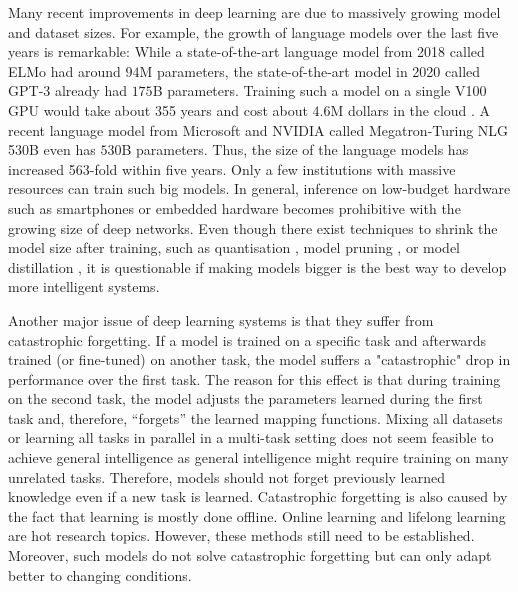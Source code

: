 Many recent improvements in deep learning are due to massively growing model and dataset sizes.
For example, the growth of language models over the last five years is remarkable:
While a state-of-the-art language model from 2018 called ELMo  had around \(94\)M parameters, the state-of-the-art model in 2020 called GPT-3  already had \(175\)B parameters. Training such a model on a single V100 GPU would take about 355 years and cost about \(4.6\)M dollars in the cloud .
A recent language model from Microsoft and NVIDIA called Megatron-Turing NLG 530B  even has \(530\)B parameters.
Thus, the size of the language models has increased 563-fold within five years.
Only a few institutions with massive resources can train such big models.
In general, inference on low-budget hardware such as smartphones or embedded hardware becomes prohibitive with the growing size of deep networks.
Even though there exist techniques to shrink the model size after training, such as quantisation , model pruning , or model distillation , it is questionable if making models bigger is the best way to develop more intelligent systems.

Another major issue of deep learning systems is that they suffer from catastrophic forgetting.
If a model is trained on a specific task and afterwards trained (or fine-tuned) on another task, the model suffers a "catastrophic" drop in performance over the first task.
The reason for this effect is that during training on the second task, the model adjusts the parameters learned during the first task and, therefore, ``forgets'' the learned mapping functions.
Mixing all datasets or learning all tasks in parallel in a multi-task setting  does not seem feasible to achieve general intelligence as general intelligence might require training on many unrelated tasks. Therefore, models should not forget previously learned knowledge even if a new task is learned.
Catastrophic forgetting is also caused by the fact that learning is mostly done offline.
Online learning  and lifelong learning  are hot research topics.
However, these methods still need to be established. Moreover, such models do not solve catastrophic forgetting but can only adapt better to changing conditions.

